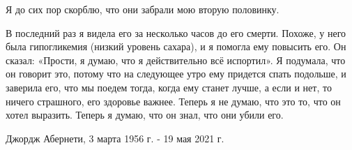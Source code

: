 Я до сих пор скорблю, что они забрали мою вторую половинку.

В последний раз я видела его за несколько часов до его смерти. Похоже, у него
была гипогликемия (низкий уровень сахара), и я помогла ему повысить его. Он
сказал: «Прости, я думаю, что я действительно всё испортил». Я подумала, что он
говорит это, потому что на следующее утро ему придется спать подольше, и
заверила его, что мы поедем тогда, когда ему станет лучше, а если и нет, то
ничего страшного, его здоровье важнее. Теперь я не думаю, что это то, что он
хотел выразить. Теперь я думаю, что он знал, что они убили его.

Джордж Абернети, 3 марта 1956 г. - 19 мая 2021 г.
